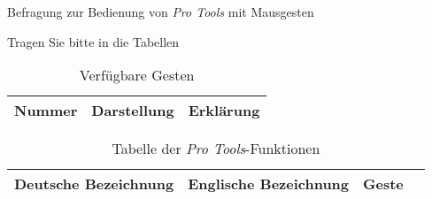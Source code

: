 \documentclass[11pt,a4paper,landscape,notitlepage]{article}
\begin{document}
\pagestyle{empty}
\begin{center}
\Large{Befragung zur Bedienung von \emph{Pro Tools} mit Mausgesten}
\end{center}

Tragen Sie bitte in die Tabellen 

\begin{table}[ht] \label{tab:Gestures}
\centering
\begin{tabular}{|l|l|l|} \hline
Nummer & Darstellung & Erklärung \\ \hline \hline
\end{tabular}
\caption{Verfügbare Gesten}
\end{table}

\begin{table}[ht] \label{tab:Functions}
\centering
\begin{tabular}{|l|l|l|l|} \hline
Deutsche Bezeichnung & Englische Bezeichnung & Geste & \\ \hline \hline
\end{tabular}
\caption{Tabelle der \emph{Pro Tools}-Funktionen}
\end{table}
\end{document}
